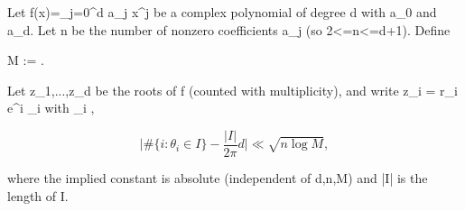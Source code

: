Let
  f(x)=\sum_{j=0}^d a_j x^j
be a complex polynomial of degree d with a_0 and a_d.
Let n be the number of nonzero coefficients a_j (so 2<=n<=d+1).
Define

  M := .

Let z_1,...,z_d be the roots of f (counted with multiplicity), and write
  z_i = r_i e^{i \theta_i} with \theta_i \in [0,2\pi).

Conjectured discrepancy bound:
For every interval I\subset[0,2\pi],

\[
  \Big| \#\{i: \theta_i \in I\} - \frac{|I|}{2\pi} d \Big| \ll \sqrt{n \log M},
\]

where the implied constant is absolute (independent of d,n,M) and |I| is the length of I.
